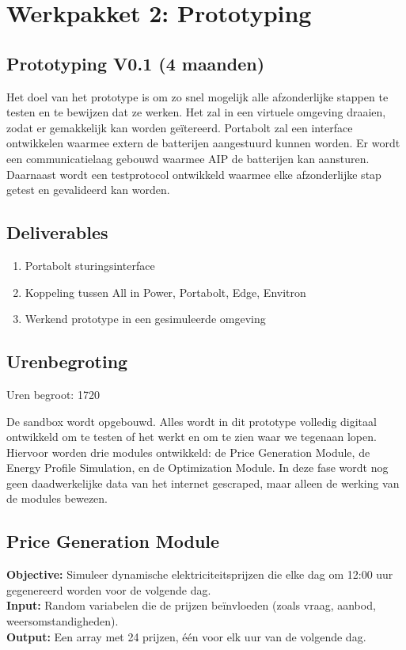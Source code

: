 \documentclass[../main.tex]{subfiles}
\begin{document}
\section{Werkpakket 2: Prototyping}

\subsection{Prototyping V0.1 (4 maanden)}
Het doel van het prototype is om zo snel mogelijk alle afzonderlijke stappen te testen en te bewijzen dat ze werken. Het zal in een virtuele omgeving draaien, zodat er gemakkelijk kan worden geïtereerd. Portabolt zal een interface ontwikkelen waarmee extern de batterijen aangestuurd kunnen worden. Er wordt een communicatielaag gebouwd waarmee AIP de batterijen kan aansturen. Daarnaast wordt een testprotocol ontwikkeld waarmee elke afzonderlijke stap getest en gevalideerd kan worden.

\subsection{Deliverables}
\begin{enumerate}
    \item Portabolt sturingsinterface
    \item Koppeling tussen All in Power, Portabolt, Edge, Envitron
    \item Werkend prototype in een gesimuleerde omgeving
\end{enumerate}

\subsection{Urenbegroting}
Uren begroot: 1720

De sandbox wordt opgebouwd. Alles wordt in dit prototype volledig digitaal ontwikkeld om te testen of het werkt en om te zien waar we tegenaan lopen. Hiervoor worden drie modules ontwikkeld: de Price Generation Module, de Energy Profile Simulation, en de Optimization Module. In deze fase wordt nog geen daadwerkelijke data van het internet gescraped, maar alleen de werking van de modules bewezen.

\subsection{Price Generation Module}
\textbf{Objective:} Simuleer dynamische elektriciteitsprijzen die elke dag om 12:00 uur gegenereerd worden voor de volgende dag. \\
\textbf{Input:} Random variabelen die de prijzen beïnvloeden (zoals vraag, aanbod, weersomstandigheden). \\
\textbf{Output:} Een array met 24 prijzen, één voor elk uur van de volgende dag.
\end{document}
